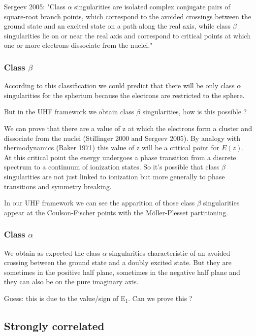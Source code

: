 \documentclass{article}
\begin{document}
Sergeev 2005:
"Class $\alpha$ singularities are isolated complex conjugate pairs of square-root branch points, which correspond to the avoided crossings between the ground state and an excited state on a path along the real axis, while class $\beta$ singularities lie on or near the real axis and correspond to critical points at which one or more electrons dissociate from the nuclei."

\subsubsection{Class $\beta$}

According to this classification we could predict that there will be only class $\alpha$ singularities for the spherium because the electrons are restricted to the sphere.

But in the UHF framework we obtain class $\beta$ singularities, how is this possible ?

We can prove that there are a value of z at which the electrons form a cluster and dissociate from the nuclei (Stillinger 2000 and Sergeev 2005). By analogy with thermodynamics (Baker 1971) this value of z will be a critical point for $E(z)$. At this critical point the energy undergoes a phase transition from a discrete spectrum to a continuum of ionization states. So it's possible that class $\beta$ singularities are not just linked to ionization but more generally to phase transitions and symmetry breaking.

In our UHF framework we can see the apparition of those class $\beta$ singularities appear at the Coulson-Fischer points with the Möller-Plesset partitioning.

\subsubsection{Class $\alpha$}

We obtain as expected the class $\alpha$ singularities characteristic of an avoided crossing between the ground state and a doubly excited state. But they are sometimes in the positive half plane, sometimes in the negative half plane and they can also be on the pure imaginary axis.

Guess: this is due to the value/sign of E\textsubscript{1}. Can we prove this ?

\subsection{Strongly correlated}
\end{document}

